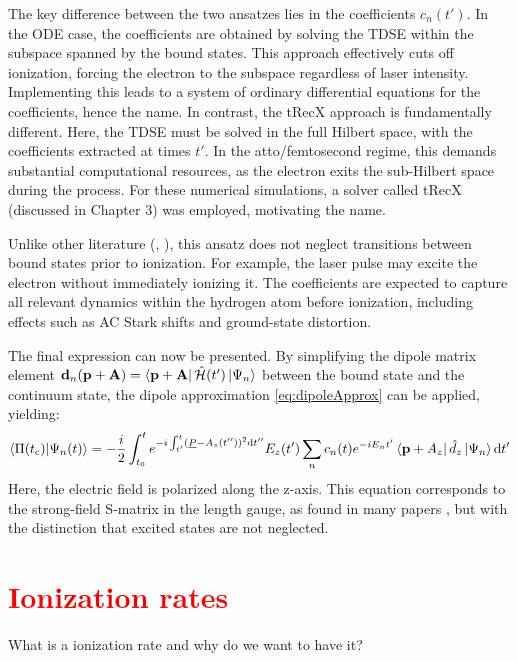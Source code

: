 \bigskip

The key difference between the two ansatzes lies in the coefficients $c_n(t')$.
In the ODE case, the coefficients are obtained by solving the TDSE within the subspace spanned by the bound states.
This approach effectively cuts off ionization, forcing the electron to the subspace regardless of laser intensity.
Implementing this leads to a system of ordinary differential equations for the coefficients, hence the name.
In contrast, the tRecX approach is fundamentally different.
Here, the TDSE must be solved in the full Hilbert space, with the coefficients extracted at times $t'$.
In the atto/femtosecond regime, this demands substantial computational resources, as the electron exits the sub-Hilbert space during the process.
For these numerical simulations, a solver called tRecX (discussed in Chapter 3) was employed, motivating the name.

Unlike other literature (\cite{Theory_NPS}, \cite{Ivanov20012005}), this ansatz does not neglect transitions between bound states prior to ionization.
For example, the laser pulse may excite the electron without immediately ionizing it.
The coefficients are expected to capture all relevant dynamics within the hydrogen atom before ionization, including effects such as AC Stark shifts and ground-state distortion.

The final expression can now be presented.
By simplifying the dipole matrix element $\mathbf{d}_n(\mathbf{p}+\mathbf{A}) = \bra{\mathbf{p}+\mathbf{A}}\hat{\mathcal{H}}(t')\ket{\Psi_n}$ between the bound state and the continuum state, the dipole approximation \eqref{eq:dipoleApprox} can be applied, yielding:
\begin{equation*}
    \braket{\Pi(t_{\mathrm{c}})|\Psi_n(t)} = -\frac{i}{2}\int_{t_0}^{t} e^{-i \int_{t'}^{t} (\underline{P} - A_z(t''))^2 \mathrm{d} t''}E_z(t')\sum_{n}c_n(t)e^{-iE_nt'}\bra{\mathbf{p}+A_z}\hat{d}_z\ket{\Psi_n} \mathrm{d} t'       \label{eq:smatrix}
\end{equation*}
Here, the electric field is polarized along the z-axis.
This equation corresponds to the strong-field S-matrix in the length gauge, as found in many papers \cite{Theory_NPS}, but with the distinction that excited states are not neglected.




\section{\textcolor{red}{Ionization rates}}
What is a ionization rate and why do we want to have it?

